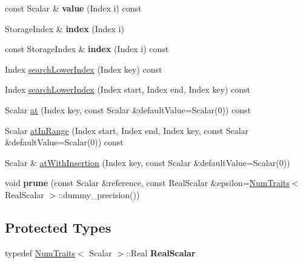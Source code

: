 \begin{DoxyCompactItemize}
const Scalar \& {\bfseries value} (Index i) const
\item 
\mbox{\label{class_eigen_1_1internal_1_1_compressed_storage_a04f1c912dad61d2620a53c9418a9f906}} 
Storage\+Index \& {\bfseries index} (Index i)
\item 
\mbox{\label{class_eigen_1_1internal_1_1_compressed_storage_a7bec4e88206a90b374af95e64e1879f3}} 
const Storage\+Index \& {\bfseries index} (Index i) const
\item 
Index \mbox{\hyperlink{class_eigen_1_1internal_1_1_compressed_storage_ad96105b5ab19886e96076513eab77da5}{search\+Lower\+Index}} (Index key) const
\item 
Index \mbox{\hyperlink{class_eigen_1_1internal_1_1_compressed_storage_a250b3282557fc6da7cf505f93ab5ad59}{search\+Lower\+Index}} (Index start, Index end, Index key) const
\item 
Scalar \mbox{\hyperlink{class_eigen_1_1internal_1_1_compressed_storage_a0fe151c0217177fd43df764e8e0cdec2}{at}} (Index key, const Scalar \&default\+Value=Scalar(0)) const
\item 
Scalar \mbox{\hyperlink{class_eigen_1_1internal_1_1_compressed_storage_a70c2745dd270aaa44b415ec2e9bf2ae0}{at\+In\+Range}} (Index start, Index end, Index key, const Scalar \&default\+Value=Scalar(0)) const
\item 
Scalar \& \mbox{\hyperlink{class_eigen_1_1internal_1_1_compressed_storage_a8621aa0d1d0e27b025d41b9321968357}{at\+With\+Insertion}} (Index key, const Scalar \&default\+Value=Scalar(0))
\item 
\mbox{\label{class_eigen_1_1internal_1_1_compressed_storage_ab82e42c20bd4522475aec0dd61835259}} 
void {\bfseries prune} (const Scalar \&reference, const Real\+Scalar \&epsilon=\mbox{\hyperlink{struct_eigen_1_1_num_traits}{Num\+Traits}}$<$ Real\+Scalar $>$\+::dummy\+\_\+precision())
\end{DoxyCompactItemize}
\subsection*{Protected Types}
\begin{DoxyCompactItemize}
\item 
\mbox{\label{class_eigen_1_1internal_1_1_compressed_storage_ac74d44c0ee51ef7b98d274c6a10fbf93}} 
typedef \mbox{\hyperlink{struct_eigen_1_1_num_traits}{Num\+Traits}}$<$ Scalar $>$\+::Real {\bfseries Real\+Scalar}
\end{DoxyCompactItemize}
